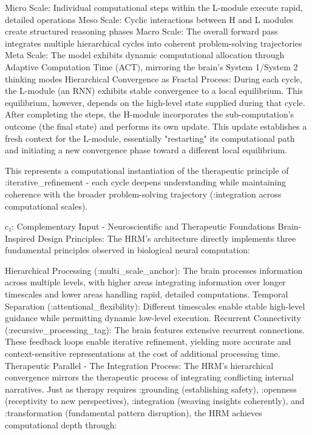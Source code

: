 Micro Scale: Individual computational steps within the L-module execute rapid, detailed operations
Meso Scale: Cyclic interactions between H and L modules create structured reasoning phases
Macro Scale: The overall forward pass integrates multiple hierarchical cycles into coherent problem-solving trajectories
Meta Scale: The model exhibits dynamic computational allocation through Adaptive Computation Time (ACT), mirroring the brain's System 1/System 2 thinking modes
Hierarchical Convergence as Fractal Process: During each cycle, the L-module (an RNN) exhibits stable convergence to a local equilibrium. This equilibrium, however, depends on the high-level state supplied during that cycle. After completing the steps, the H-module incorporates the sub-computation's outcome (the final state) and performs its own update. This update establishes a fresh context for the L-module, essentially "restarting" its computational path and initiating a new convergence phase toward a different local equilibrium.

This represents a computational instantiation of the therapeutic principle of :iterative_refinement - each cycle deepens understanding while maintaining coherence with the broader problem-solving trajectory (:integration across computational scales).

c₁: Complementary Input - Neuroscientific and Therapeutic Foundations
Brain-Inspired Design Principles: The HRM's architecture directly implements three fundamental principles observed in biological neural computation:

Hierarchical Processing (:multi_scale_anchor): The brain processes information across multiple levels, with higher areas integrating information over longer timescales and lower areas handling rapid, detailed computations.
Temporal Separation (:attentional_flexibility): Different timescales enable stable high-level guidance while permitting dynamic low-level execution.
Recurrent Connectivity (:recursive_processing_tag): The brain features extensive recurrent connections. These feedback loops enable iterative refinement, yielding more accurate and context-sensitive representations at the cost of additional processing time.
Therapeutic Parallel - The Integration Process: The HRM's hierarchical convergence mirrors the therapeutic process of integrating conflicting internal narratives. Just as therapy requires :grounding (establishing safety), :openness (receptivity to new perspectives), :integration (weaving insights coherently), and :transformation (fundamental pattern disruption), the HRM achieves computational depth through:

